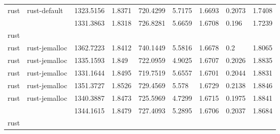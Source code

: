 \begin{longtable}[h]{|lllllllll|}
rust           & rust-default           & 1323.5156                 & 1.8371                                                               & 720.4299              & 5.7175           & 1.6693           & 0.2073       & 1.7408        \\
               &                        & 1331.3863                 & 1.8318                                                               & 726.8281              & 5.6659           & 1.6708           & 0.196        & 1.7239        \\
rust           &                        &                           &                                                                      &                       &                  &                  &              &               \\
rust           & rust-jemalloc          & 1362.7223                 & 1.8412                                                               & 740.1449              & 5.5816           & 1.6678           & 0.2          & 1.8065        \\
rust           & rust-jemalloc          & 1335.1593                 & 1.849                                                                & 722.0959              & 4.9025           & 1.6707           & 0.2026       & 1.8835        \\
rust           & rust-jemalloc          & 1331.1644                 & 1.8495                                                               & 719.7519              & 5.6557           & 1.6701           & 0.2044       & 1.8831        \\
rust           & rust-jemalloc          & 1351.3727                 & 1.8526                                                               & 729.4569              & 5.578            & 1.6729           & 0.2138       & 1.8846        \\
rust           & rust-jemalloc          & 1340.3887                 & 1.8473                                                               & 725.5969              & 4.7299           & 1.6715           & 0.1975       & 1.8841        \\
               &                        & 1344.1615                 & 1.8479                                                               & 727.4093              & 5.2895           & 1.6706           & 0.2037       & 1.8684        \\
rust           &                        &                           &                                                                      &                       &                  &                  &              &               \\

\end{longtable}
